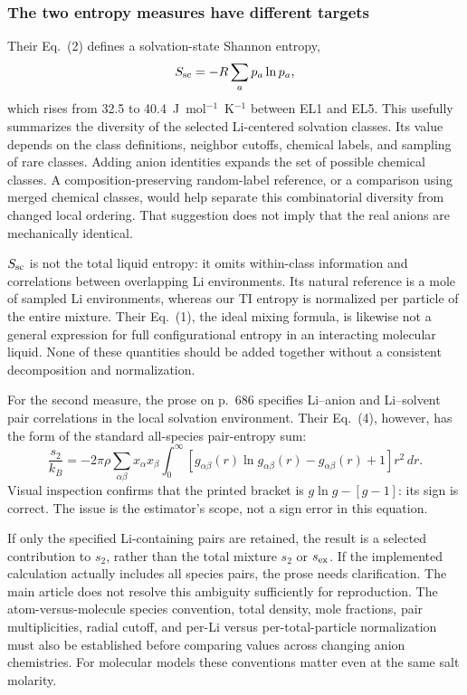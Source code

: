 \documentclass[11pt,a4paper]{article}
\begin{document}
\subsubsection{The two entropy measures have different targets}
Their Eq.~(2) defines a solvation-state Shannon entropy,
\begin{equation}
S_{\rm sc}=-R\sum_a p_a\ln p_a,
\end{equation}
which rises from 32.5 to 40.4~J~mol$^{-1}$~K$^{-1}$ between EL1 and EL5.
This usefully summarizes the diversity of the selected Li-centered solvation
classes. Its value depends on the class definitions, neighbor cutoffs,
chemical labels, and sampling of rare classes. Adding anion identities
expands the set of possible chemical classes. A composition-preserving
random-label reference, or a comparison using merged chemical classes,
would help separate this combinatorial diversity from changed local ordering.
That suggestion does not imply that the real anions are mechanically identical.

$S_{\rm sc}$ is not the total liquid entropy: it omits within-class information
and correlations between overlapping Li environments. Its natural reference
is a mole of sampled Li environments, whereas our TI entropy is normalized
per particle of the entire mixture. Their Eq.~(1), the ideal mixing formula,
is likewise not a general expression for full configurational entropy in
an interacting molecular liquid. None of these quantities should be added
together without a consistent decomposition and normalization.

For the second measure, the prose on p.~686 specifies Li--anion and
Li--solvent pair correlations in the local solvation environment. Their
Eq.~(4), however, has the form of the standard all-species pair-entropy sum:
\begin{equation}
\frac{s_2}{k_B}=-2\pi\rho\sum_{\alpha\beta}x_\alpha x_\beta
\int_0^\infty\!\left[g_{\alpha\beta}(r)\ln g_{\alpha\beta}(r)
-g_{\alpha\beta}(r)+1\right]r^2\,dr.
\end{equation}
Visual inspection confirms that the printed bracket is
$g\ln g-[g-1]$: its sign is correct. The issue is the estimator's scope,
not a sign error in this equation.

If only the specified Li-containing pairs are retained, the result is a
selected contribution to $s_2$, rather than the total mixture $s_2$ or
$s_{\rm ex}$. If the implemented calculation actually includes all species
pairs, the prose needs clarification. The main article does not resolve
this ambiguity sufficiently for reproduction. The atom-versus-molecule
species convention, total density, mole fractions, pair multiplicities,
radial cutoff, and per-Li versus per-total-particle normalization must also
be established before comparing values across changing anion chemistries.
For molecular models these conventions matter even at the same salt molarity.
\end{document}
